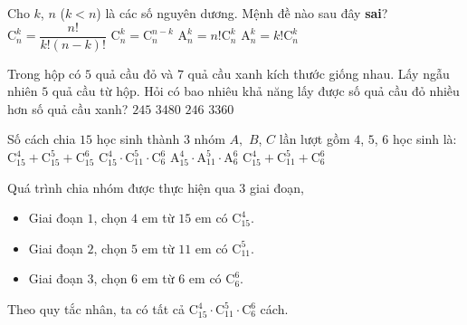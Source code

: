 \begin{ex}%
	Cho $k$, $n$ ($k<n$) là các số nguyên dương. Mệnh đề nào sau đây \textbf{sai}?
	\choice
	{$\mathrm{C}_n^k=\dfrac{n!}{k!(n-k)!}$}
	{$\mathrm{C}_n^k=\mathrm{C}_n^{n-k}$}
	{\True $\mathrm{A}_n^k=n!\mathrm{C}_n^k$}
	{$\mathrm{A}_n^k=k!\mathrm{C}_n^k$}
\end{ex}
\begin{ex}%
	Trong hộp có $ 5 $ quả cầu đỏ và $ 7 $ quả cầu xanh kích thước giống nhau. Lấy ngẫu nhiên $ 5 $ quả cầu từ hộp. Hỏi có bao nhiêu khả năng lấy được số quả cầu đỏ nhiều hơn số quả cầu xanh?
	\choice
	{$ 245 $}
	{$ 3480 $}
	{\True $ 246 $}
	{$ 3360 $}
\end{ex}
\begin{ex}%
	Số cách chia $ 15 $ học sinh thành $ 3 $ nhóm $ A,$ $ B $, $C $ lần lượt gồm $4$, $ 5 $, $6 $ học sinh là:
	\choice
	{ $\mathrm{C}^4_{15}+\mathrm{C}^5_{15}+\mathrm{C}^6_{15}$}
	{\True$\mathrm{C}^4_{15}\cdot\mathrm{C}^5_{11}\cdot\mathrm{C}^6_{6}$}
	{$\mathrm{A}^4_{15}\cdot\mathrm{A}^5_{11}\cdot\mathrm{A}^6_{6}$}
	{$\mathrm{C}^4_{15}+\mathrm{C}^5_{11}+\mathrm{C}^6_{6}$}
	\loigiai
	{
		Quá trình chia nhóm được thực hiện qua $ 3 $ giai đoạn,
		\begin{itemize}
			\item Giai đoạn $ 1 $, chọn $ 4 $ em từ $ 15 $ em có $ \mathrm{C}^4_{15} $.
			\item Giai đoạn $ 2 $, chọn $ 5 $ em từ $ 11 $ em có $ \mathrm{C}^5_{11} $.
			\item Giai đoạn $ 3 $, chọn $ 6 $ em từ $ 6 $ em có $ \mathrm{C}^6_{6} $.
		\end{itemize}
		Theo quy tắc nhân, ta có tất cả $ \mathrm{C}^4_{15}\cdot \mathrm{C}^5_{11}\cdot\mathrm{C}^6_{6}$ cách.
	}
\end{ex}
